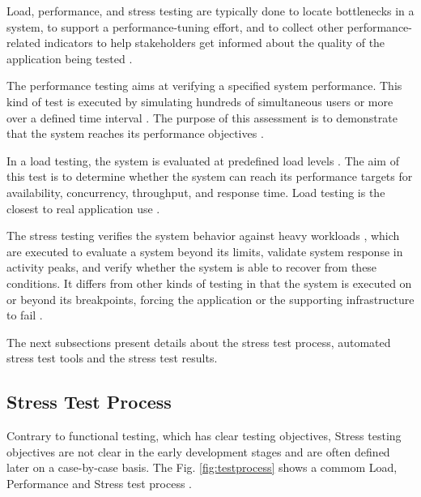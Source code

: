 \documentclass[review]{elsarticle}
\begin{document}
Load, performance, and stress testing are typically done to locate bottlenecks in a system, to support a performance-tuning effort, and to collect other performance-related indicators to help stakeholders get informed about the quality of the application being tested \cite{Sandler2004} \cite{Corporation2007}. 

The performance testing aims at verifying a specified system performance. This kind of test is executed by simulating hundreds of simultaneous users or more over a defined time interval \cite{DiLucca2006}. The purpose of this assessment is to demonstrate that the system reaches its performance objectives \cite{Sandler2004}. 


In a load testing, the system is evaluated at predefined load levels \cite{DiLucca2006}. The aim of this test is to determine whether the system can reach its performance targets for availability, concurrency, throughput, and response time. Load testing is the closest to real application use \cite{Molyneaux2009}.

The stress testing verifies the system behavior against heavy workloads \cite{Sandler2004}, which are executed to evaluate a system beyond its limits, validate system response in activity peaks, and verify whether the system is able to recover from these conditions. It differs from other kinds of testing in that the system is executed on or beyond its breakpoints, forcing the application or the supporting infrastructure to fail \cite{DiLucca2006} \cite{Molyneaux2009}.

The next subsections present details about the stress test process, automated stress test tools and the stress test results.

\subsection{Stress Test Process}

Contrary to functional testing, which has clear testing objectives, Stress testing objectives are not clear in the early development stages and are often defined later on a case-by-case basis. The Fig. \ref{fig:testprocess} shows a commom Load, Performance and Stress test process  \cite{Jiang2010}.
\end{document}
